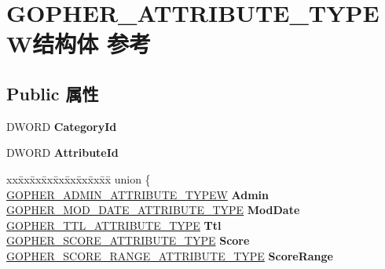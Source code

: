 \hypertarget{struct_g_o_p_h_e_r___a_t_t_r_i_b_u_t_e___t_y_p_e_w}{}\section{G\+O\+P\+H\+E\+R\+\_\+\+A\+T\+T\+R\+I\+B\+U\+T\+E\+\_\+\+T\+Y\+P\+E\+W结构体 参考}
\label{struct_g_o_p_h_e_r___a_t_t_r_i_b_u_t_e___t_y_p_e_w}
\subsection*{Public 属性}
\begin{DoxyCompactItemize}
\item 
\mbox{\label{struct_g_o_p_h_e_r___a_t_t_r_i_b_u_t_e___t_y_p_e_w_aed9bff017fa6548f5ae2e014fa7f1d11}} 
D\+W\+O\+RD {\bfseries Category\+Id}
\item 
\mbox{\label{struct_g_o_p_h_e_r___a_t_t_r_i_b_u_t_e___t_y_p_e_w_abc321105953e718d6768e0cac07616dc}} 
D\+W\+O\+RD {\bfseries Attribute\+Id}
\item 
\mbox{\label{struct_g_o_p_h_e_r___a_t_t_r_i_b_u_t_e___t_y_p_e_w_aef2c0857c7ec6be5ad51021591e380db}} 
\begin{tabbing}
xx\=xx\=xx\=xx\=xx\=xx\=xx\=xx\=xx\=\kill
union \{\\
\>\hyperlink{struct_g_o_p_h_e_r___a_d_m_i_n___a_t_t_r_i_b_u_t_e___t_y_p_e_w}{GOPHER\_ADMIN\_ATTRIBUTE\_TYPEW} {\bfseries Admin}\\
\>\hyperlink{struct_g_o_p_h_e_r___m_o_d___d_a_t_e___a_t_t_r_i_b_u_t_e___t_y_p_e}{GOPHER\_MOD\_DATE\_ATTRIBUTE\_TYPE} {\bfseries ModDate}\\
\>\hyperlink{struct_g_o_p_h_e_r___t_t_l___a_t_t_r_i_b_u_t_e___t_y_p_e}{GOPHER\_TTL\_ATTRIBUTE\_TYPE} {\bfseries Ttl}\\
\>\hyperlink{struct_g_o_p_h_e_r___s_c_o_r_e___a_t_t_r_i_b_u_t_e___t_y_p_e}{GOPHER\_SCORE\_ATTRIBUTE\_TYPE} {\bfseries Score}\\
\>\hyperlink{struct_g_o_p_h_e_r___s_c_o_r_e___r_a_n_g_e___a_t_t_r_i_b_u_t_e___t_y_p_e}{GOPHER\_SCORE\_RANGE\_ATTRIBUTE\_TYPE} {\bfseries ScoreRange}\\

\end{tabbing}
\end{DoxyCompactItemize}
